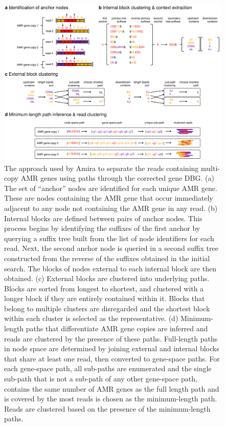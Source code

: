 \begin{figure}
\centering
\includegraphics[width=1\linewidth]{Figures/figure_6.pdf}
\caption{The approach used by Amira to separate the reads containing multi-copy AMR genes using paths through the corrected gene DBG. (a) The set of “anchor” nodes are identified for each unique AMR gene. These are nodes containing the AMR gene that occur immediately adjacent to any node not containing the AMR gene in any read. (b) Internal blocks are defined between pairs of anchor nodes. This process begins by identifying the suffixes of the first anchor by querying a suffix tree built from the list of node identifiers for each read. Next, the second anchor node is queried in a second suffix tree constructed from the reverse of the suffixes obtained in the initial search. The blocks of nodes external to each internal block are then obtained. (c) External blocks are clustered into underlying paths. Blocks are sorted from longest to shortest, and clustered with a longer block if they are entirely contained within it. Blocks that belong to multiple clusters are disregarded and the shortest block within each cluster is selected as the representative. (d) Minimum-length paths that differentiate AMR gene copies are inferred and reads are clustered by the presence of these paths. Full-length paths in node space are determined by joining external and internal blocks that share at least one read, then converted to gene-space paths. For each gene-space path, all sub-paths are enumerated and the single sub-path that is not a sub-path of any other gene-space path, contains the same number of AMR genes as the full length path and is covered by the most reads is chosen as the minimum-length path. Reads are clustered based on the presence of the minimum-length paths.}
\label{fig:6}
\end{figure}

